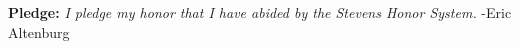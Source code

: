 \documentclass[11pt]{article}
\begin{document}
\raggedright
\newcommand\NAME{Eric Altenburg}  %
\newcommand\COURSE{MA-240}
\newcommand\HWNUM{10 Corrections}              %


\begin{center}
	\textbf{Pledge:} \textit{I pledge my honor that I have abided by the Stevens Honor System.} -Eric Altenburg
\end{center}
\end{document}

